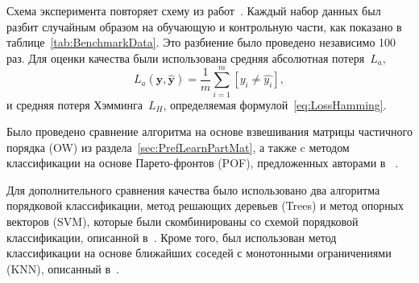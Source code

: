 \documentclass{elsarticle}
\newcommand{\by}{\mathbf{y}}
\begin{document}
Схема эксперимента повторяет схему из работ~\cite{stenina2015ordinal, chu2007support}. Каждый набор данных был разбит случайным образом на обучающую и контрольную части, как показано в таблице~\ref{tab:BenchmarkData}. Это разбиение было проведено независимо 100 раз. Для оценки качества были использована средняя абсолютная потеря~$L_a$,
\[
L_a(\by,\hat{\by})=\frac{1}{m}\sum\limits_{i=1}^m[y_i\neq \hat{y_i}],
\]
и средняя потеря Хэмминга~$L_H$, определяемая формулой~\eqref{eq:LossHamming}.

Было проведено сравнение алгоритма на основе взвешивания матрицы частичного порядка (OW) из раздела~\ref{sec:PrefLearnPartMat}, а также c методом классификации на основе Парето-фронтов (POF), предложенных авторами в ~\cite{stenina2015ordinal}.

Для дополнительного сравнения качества было использовано два алгоритма порядковой классификации, метод решающих деревьев (Trees) и метод опорных векторов (SVM), которые были скомбинированы со схемой порядковой классификации, описанной в~\cite{frank2001simple}. Кроме того, был использован метод классификации на основе ближайших соседей с монотонными ограничениями (KNN), описанный в~\cite{duivesteijn2008knn}.
\end{document}

